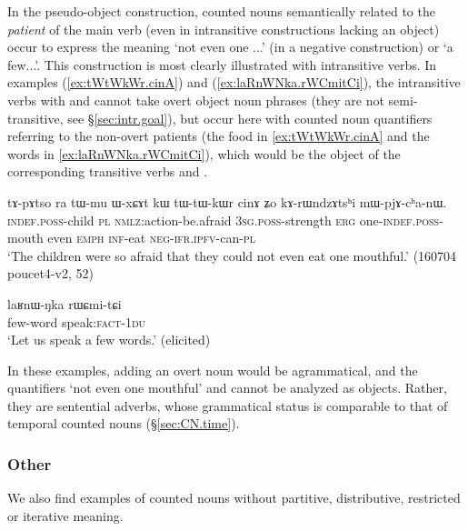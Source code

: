 In the pseudo-object construction, counted nouns semantically related to the \textit{patient} of the main verb (even in intransitive constructions lacking an object) occur to express the meaning `not even one ...' (in a negative construction) or `a few...'. This construction is most clearly illustrated with intransitive verbs. In examples (\ref{ex:tWtWkWr.cinA}) and (\ref{ex:laRnWNka.rWCmitCi}), the intransitive verbs with  and  cannot take overt object noun phrases (they are not semi-transitive, see §\ref{sec:intr.goal}), but occur here with counted noun quantifiers referring to the non-overt patients (the food in \ref{ex:tWtWkWr.cinA} and the words in \ref{ex:laRnWNka.rWCmitCi}), which would be the object of the corresponding transitive verbs  and  .


\begin{exe}
	\ex \label{ex:tWtWkWr.cinA}
	\gll tɤ-pɤtso ra tɯ-mu ɯ-xɕɤt kɯ tɯ-tɯ-kɯr cinɤ ʑo kɤ-rɯndzɤtsʰi mɯ-pjɤ-cʰa-nɯ. \\
	\textsc{indef}.\textsc{poss}-child \textsc{pl} \textsc{nmlz}:action-be.afraid \textsc{3sg}.\textsc{poss}-strength \textsc{erg} one-\textsc{indef}.\textsc{poss}-mouth even \textsc{emph} \textsc{inf}-eat \textsc{neg}-\textsc{ifr}.\textsc{ipfv}-can-\textsc{pl} \\
	\glt `The children were so afraid that they could not even eat one mouthful.' (160704 poucet4-v2, 52)
\end{exe}

\begin{exe}
	\ex \label{ex:laRnWNka.rWCmitCi}
	\gll laʁnɯ-ŋka rɯɕmi-tɕi \\
	few-word speak:\textsc{fact}-\textsc{1du} \\
	\glt `Let us speak a few words.' (elicited)
\end{exe}

In these examples, adding an overt noun would be agrammatical, and the quantifiers  `not even one mouthful' and  cannot be analyzed as objects. Rather, they are sentential adverbs, whose grammatical status is comparable to that of temporal counted nouns (§\ref{sec:CN.time}).


\subsubsection{Other}
We also find examples of counted nouns without partitive, distributive, restricted or iterative meaning.

